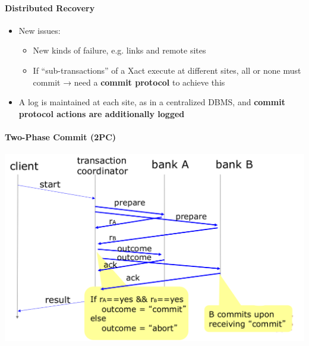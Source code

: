 \paragraph{Distributed Recovery}
\begin{itemize}
\item New issues:
  \begin{itemize}
  \item New kinds of failure, e.g. links and remote sites
  \item If ``sub-transactions'' of a Xact execute at different
    sites, all or none must commit
    → need a \textbf{commit protocol} to achieve this
  \end{itemize}

\item A log is maintained at each site, as in a centralized DBMS,
  and \textbf{commit protocol actions are additionally logged}
\end{itemize}


\paragraph{Two-Phase Commit (2PC)}

\includegraphics[scale=0.15]{graphics/two-phase-commit.png}

